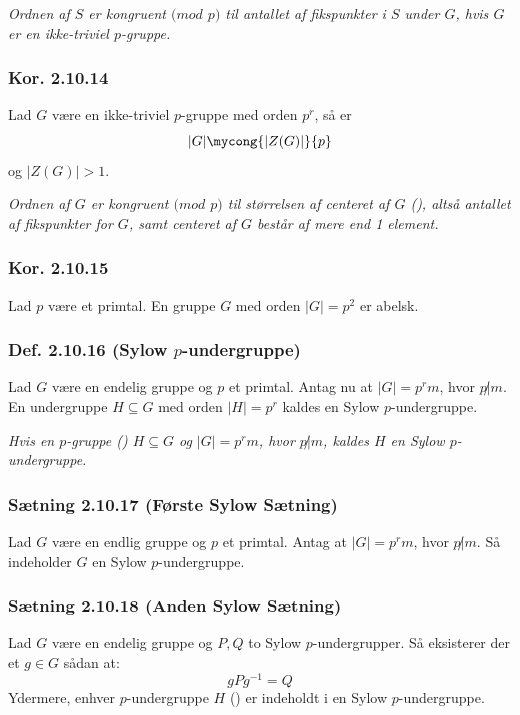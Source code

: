 \textit{Ordnen af $S$ er kongruent $(mod$  $p)$ til antallet af fikspunkter i
$S$ under $G$, hvis $G$ er en ikke-triviel $p$-gruppe.}

\subsubsection{Kor. 2.10.14}
Lad $G$ være en ikke-triviel $p$-gruppe med orden $p^r$, så er
\begin{equation*}
  |G| \mycong{|Z(G)|}{p}
\end{equation*}
og $|Z(G)| > 1$.

\textit{Ordnen af $G$ er kongruent $(mod$  $p)$ til størrelsen af centeret af
$G$ (), altså antallet af fikspunkter for $G$, samt centeret af
$G$ består af mere end 1 element.}

\subsubsection{Kor. 2.10.15}
Lad $p$ være et primtal. En gruppe $G$ med orden $|G| = p^2$ er abelsk.

\subsubsection{Def. 2.10.16 (Sylow $p$-undergruppe)}
\label{sylow-$p$-undergruppe}
Lad $G$ være en endelig gruppe og $p$ et primtal. Antag nu at $|G| = p^r m$,
hvor $p \not | m$. En undergruppe $H \subseteq G$ med orden $|H| = p^r$ kaldes
en Sylow $p$-undergruppe.

\textit{Hvis en $p$-gruppe () $H \subseteq G$ og $|G| = p^r m$,
hvor $p \not | m$, kaldes $H$ en Sylow $p$-undergruppe.}

\subsubsection{Sætning 2.10.17 (Første Sylow Sætning)}
Lad $G$ være en endlig gruppe og $p$ et primtal. Antag at $|G| = p^r m$, hvor $p
\not | m$. Så indeholder $G$ en Sylow $p$-undergruppe.

\subsubsection{Sætning 2.10.18 (Anden Sylow Sætning)}
Lad $G$ være en endelig gruppe og $P, Q$ to Sylow $p$-undergrupper. Så
eksisterer der et $g \in G$ sådan at:
\begin{equation*}
  gPg^{-1} = Q
\end{equation*}
Ydermere, enhver $p$-undergruppe $H$ () er indeholdt i en Sylow
$p$-undergruppe.

